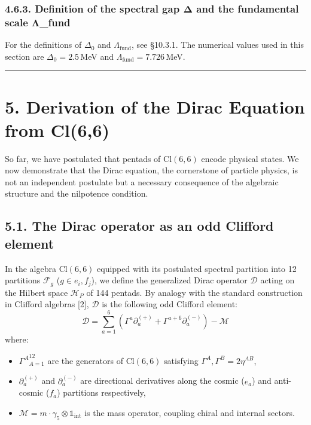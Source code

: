 \documentclass[11pt]{article}
\providecommand{\tightlist}{\setlength{\itemsep}{2pt}\setlength{\parskip}{6pt}}
\let\oldmathcal\mathcal
\renewcommand{\mathcal}[1]{\oldmathcal{#1}}
\providecommand{\tightlist}{%
  \setlength{\itemsep}{2pt}\setlength{\parskip}{6pt}
}
\begin{document}
\hypertarget{definition-of-the-spectral-gap-ux3b4-and-the-fundamental-scale-ux3bb_fund}{%
\subsubsection{4.6.3. Definition of the spectral gap Δ and the
fundamental scale
Λ\_fund}\label{definition-of-the-spectral-gap-ux3b4-and-the-fundamental-scale-ux3bb_fund}}

For the definitions of \(\Delta_0\) and \(\Lambda_{\text{fund}}\), see
§10.3.1. The numerical values used in this section are
\(\Delta_0 = 2.5\)\,MeV and \(\Lambda_{\text{fund}} = 7.726\)\,MeV.

\begin{center}\rule{0.5\linewidth}{0.5pt}\end{center}

\hypertarget{derivation-of-the-dirac-equation-from-cl66}{%
\section{5. Derivation of the Dirac Equation from
Cl(6,6)}\label{derivation-of-the-dirac-equation-from-cl66}}

So far, we have postulated that pentads of \(\text{Cl}(6,6)\) encode
physical states. We now demonstrate that the Dirac equation, the
cornerstone of particle physics, is not an independent postulate but a
necessary consequence of the algebraic structure and the nilpotence
condition.

\hypertarget{the-dirac-operator-as-an-odd-clifford-element}{%
\subsection{5.1. The Dirac operator as an odd Clifford
element}\label{the-dirac-operator-as-an-odd-clifford-element}}

In the algebra \(\text{Cl}(6,6)\) equipped with its postulated spectral
partition into 12 partitions \(\mathcal{F}_g\) (\(g \in {e_i, f_j}\)),
we define the generalized Dirac operator \(\mathcal{D}\) acting on the
Hilbert space \(\mathcal{H}_P\) of 144 pentads. By analogy with the
standard construction in Clifford algebras {[}2{]}, \(\mathcal{D}\) is
the following odd Clifford element: \[
\mathcal{D} = \sum_{a=1}^{6} \left( \Gamma^a \partial_a^{(+)} + \Gamma^{a+6} \partial_a^{(-)} \right) - \mathcal{M}
\] where:

\begin{itemize}
\tightlist
\item
  \({\Gamma^A}_{A=1}^{12}\) are the generators of \(\text{Cl}(6,6)\)
  satisfying \({\Gamma^A, \Gamma^B} = 2\eta^{AB}\),
\item
  \(\partial_a^{(+)}\) and \(\partial_a^{(-)}\) are directional
  derivatives along the cosmic (\(e_a\)) and anti-cosmic (\(f_a\))
  partitions respectively,
\item
  \(\mathcal{M} = m \cdot \gamma_5 \otimes \mathbb{1}_{\text{int}}\) is
  the mass operator, coupling chiral and internal sectors.
\end{itemize}
\end{document}
